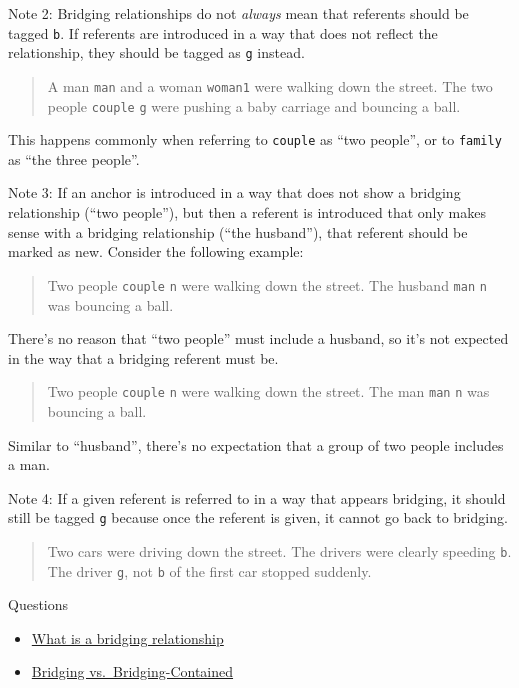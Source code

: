 \documentclass[
]{book}
\providecommand{\tightlist}{%
  \setlength{\itemsep}{0pt}\setlength{\parskip}{0pt}}
\begin{document}
Note 2:
Bridging relationships do not \emph{always} mean that
referents should be tagged \texttt{b}.
If referents are introduced
in a way that does not reflect the relationship,
they should be tagged as \texttt{g} instead.

\begin{quote}
A man \texttt{man} and a woman \texttt{woman1} were walking down the street.
The two people \texttt{couple} \texttt{g}
were pushing a baby carriage and bouncing a ball.
\end{quote}

This happens commonly when referring to \texttt{couple} as ``two people'',
or to \texttt{family} as ``the three people''.

Note 3:
If an anchor is introduced
in a way that does not show a bridging relationship (``two people''),
but then a referent is introduced
that only makes sense with a bridging relationship (``the husband''),
that referent should be marked as new.
Consider the following example:

\begin{quote}
Two people \texttt{couple} \texttt{n} were walking down the street.
The husband \texttt{man} \texttt{n} was bouncing a ball.
\end{quote}

There's no reason that ``two people'' must include a husband,
so it's not expected in the way that a bridging referent must be.

\begin{quote}
Two people \texttt{couple} \texttt{n} were walking down the street.
The man \texttt{man} \texttt{n} was bouncing a ball.
\end{quote}

Similar to ``husband'',
there's no expectation that a group of two people includes a man.

Note 4:
If a given referent is referred to in a way that appears
bridging, it should still be tagged \texttt{g}
because once the referent is given, it cannot go back to bridging.

\begin{quote}
Two cars were driving down the street.
The drivers were clearly speeding \texttt{b}.
The driver \texttt{g}, not \texttt{b} of the first car stopped suddenly.
\end{quote}

Questions

\begin{itemize}
\tightlist
\item
  \protect\hyperlink{bridging-relationships}{What is a bridging relationship}
\item
  \protect\hyperlink{bridging-vs.-bridging-contained}{Bridging vs.~Bridging-Contained}
\end{itemize}
\end{document}
